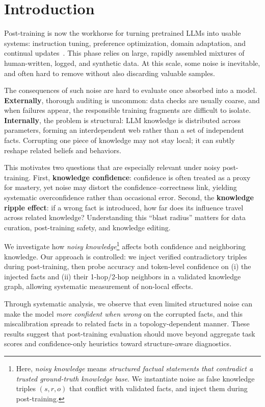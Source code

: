 \section{Introduction}
Post-training is now the workhorse for turning pretrained LLMs into usable systems: instruction tuning, preference optimization, domain adaptation, and continual updates~\citep{cite}. This phase relies on large, rapidly assembled mixtures of human-written, logged, and synthetic data. At this scale, some noise is inevitable, and often hard to remove without also discarding valuable samples.

The consequences of such noise are hard to evaluate once absorbed into a model.
\textbf{Externally}, thorough auditing is uncommon: data checks are usually coarse, and when failures appear, the responsible training fragments are difficult to isolate.
\textbf{Internally}, the problem is structural: LLM knowledge is distributed across parameters, forming an interdependent web rather than a set of independent facts. Corrupting one piece of knowledge may not stay local; it can subtly reshape related beliefs and behaviors.

This motivates two questions that are especially relevant under noisy post-training.
First, \textbf{knowledge confidence}: confidence is often treated as a proxy for mastery, yet noise may distort the confidence--correctness link, yielding systematic overconfidence rather than occasional error.
Second, the \textbf{knowledge ripple effect}: if a wrong fact is introduced, how far does its influence travel across related knowledge? Understanding this ``blast radius'' matters for data curation, post-training safety, and knowledge editing.

We investigate how \emph{noisy knowledge}\footnote{Here, \emph{noisy knowledge} means \emph{structured factual statements that contradict a trusted ground-truth knowledge base}. We instantiate noise as false knowledge triples $(s,r,o)$ that conflict with validated facts, and inject them during post-training.} affects both confidence and neighboring knowledge.
Our approach is controlled: we inject verified contradictory triples during post-training, then probe accuracy and token-level confidence on (i) the injected facts and (ii) their 1-hop/2-hop neighbors in a validated knowledge graph, allowing systematic measurement of non-local effects.

Through systematic analysis, we observe that even limited structured noise can make the model \emph{more confident when wrong} on the corrupted facts, and this miscalibration spreads to related facts in a topology-dependent manner. These results suggest that post-training evaluation should move beyond aggregate task scores and confidence-only heuristics toward structure-aware diagnostics.

